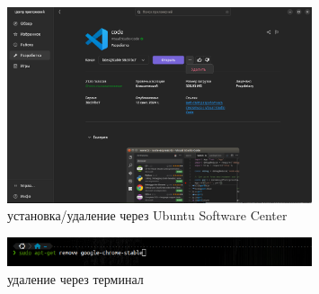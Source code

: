 \begin{figure}[!h]
    \centering
    \includegraphics[width = 0.8\textwidth]{images/installDelVScode.png}
    
    \caption{установка/удаление через Ubuntu Software Center}
    
    \label{fig:installDelVScode}
\end{figure}

\begin{figure}[!h]
    \centering
    \includegraphics[width = 0.8\textwidth]{images/delChrome.png}
    
    \caption{удаление через терминал}
    
    \label{fig:delChrome}
\end{figure}

